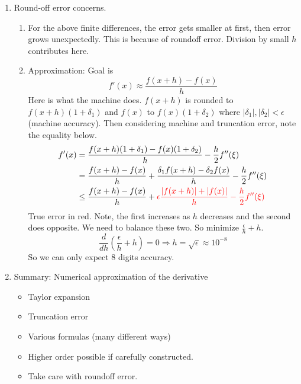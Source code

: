 \documentclass{article}
\theoremstyle{remark}
\begin{document}
\begin{enumerate}
\begin{enumerate}
\item Round-off error concerns. 
\begin{enumerate}
\item For the above finite differences, the error gets smaller at first, then error grows unexpectedly. This is because of roundoff error. Division by small $h$ contributes here.
\item Approximation: Goal is
\[
f'(x) \approx \frac{f(x+h)-f(x)}{h}
\]
Here is what the machine does. $f(x+h)$ is rounded to $f(x+h)(1+\delta_1)$ and $f(x)$ to $f(x)(1+\delta_2)$ where $|\delta_1|,|\delta_2| < \epsilon$ (machine accuracy). Then considering machine and truncation error, note the equality below.
\begin{align*}
f'(x) &= \frac{f(x+h)(1+\delta_1)-f(x)(1+\delta_2)}{h} - \frac{h}{2} f''(\xi) \\
&= \frac{f(x+h)-f(x)}{h} + \frac{\delta_1 f(x+h) - \delta_2 f(x)}{h} - \frac{h}{2} f''(\xi) \\
&\leq \frac{f(x+h)-f(x)}{h} + {\color{red} \epsilon \frac{|f(x+h)|+|f(x)|}{h} - \frac{h}{2} f''(\xi) }
\end{align*}
True error in red. Note, the first increases as $h$ decreases and the second does opposite. We need to balance these two. So minimize $\frac{\epsilon}{h} + h$.
\[
\frac{d}{dh} \left( \frac{\epsilon}{h}+h\right) = 0 \Rightarrow h = \sqrt{\epsilon} \approx 10^{-8}
\]
So we can only expect 8 digits accuracy. 
\end{enumerate}

\item Summary: Numerical approximation of the derivative 
\begin{itemize}
\item Taylor expansion
\item Truncation error
\item Various formulas (many different ways)
\item Higher order possible if carefully constructed.
\item Take care with roundoff error.
\end{itemize}
\end{enumerate}



\end{enumerate}
\end{document}
